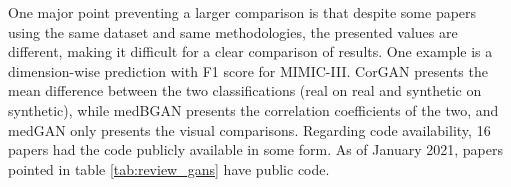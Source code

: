 One major point preventing a larger comparison is that despite some papers using the same dataset and same methodologies, the presented values are different, making it difficult for a clear comparison of results. One example is a dimension-wise prediction with F1 score for MIMIC-III. CorGAN presents the mean difference between the two classifications (real on real and synthetic on synthetic), while medBGAN presents the correlation coefficients of the two, and medGAN only presents the visual comparisons. Regarding code availability, 16 papers had the code publicly available in some form. As of January 2021, papers pointed in table \ref{tab:review_gans} have public code.





